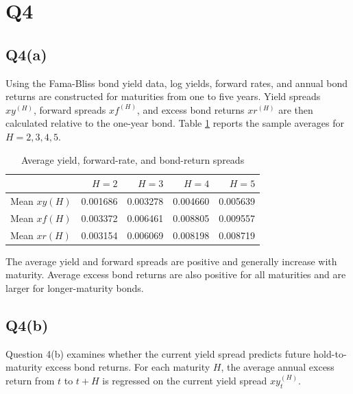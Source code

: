 \documentclass{article}
\begin{document}




\newpage

\section{Q4}

\subsection{Q4(a)}

Using the Fama-Bliss bond yield data, log yields, forward rates, and annual bond returns are constructed for maturities from one to five years. Yield spreads $xy^{(H)}$, forward spreads $xf^{(H)}$, and excess bond returns $xr^{(H)}$ are then calculated relative to the one-year bond. Table \ref{tab:q4a-averages} reports the sample averages for $H=2,3,4,5$.

\begin{table}[H]
\centering
\caption{Average yield, forward-rate, and bond-return spreads}
\label{tab:q4a-averages}
\begin{tabular}{lrrrr}
\toprule
 & $H=2$ & $H=3$ & $H=4$ & $H=5$ \\
\midrule
Mean $xy(H)$ & 0.001686 & 0.003278 & 0.004660 & 0.005639 \\
Mean $xf(H)$ & 0.003372 & 0.006461 & 0.008805 & 0.009557 \\
Mean $xr(H)$ & 0.003154 & 0.006069 & 0.008198 & 0.008719 \\
\bottomrule
\end{tabular}
\end{table}

The average yield and forward spreads are positive and generally increase with maturity. Average excess bond returns are also positive for all maturities and are larger for longer-maturity bonds.

\subsection{Q4(b)}

Question 4(b) examines whether the current yield spread predicts future hold-to-maturity excess bond returns. For each maturity $H$, the average annual excess return from $t$ to $t+H$ is regressed on the current yield spread $xy_t^{(H)}$.
\end{document}

